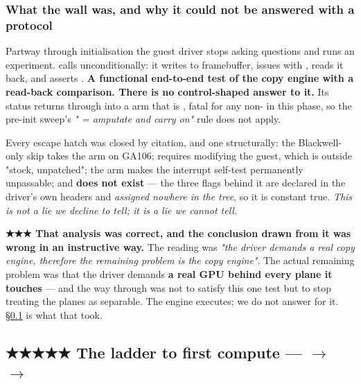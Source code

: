 \documentclass[10.5pt]{article}
\begin{document}
\subsubsection*{What the wall was, and why it could not be answered with a protocol}

Partway through initialisation the guest driver stops asking questions and runs an experiment.
 calls 
unconditionally: it
writes  to framebuffer, issues  with
, reads it back, and asserts
.
\textbf{A functional end-to-end test of the copy engine with a read-back comparison. There is no
control-shaped answer to it.} Its status returns through  into a
 arm that is , fatal for any non- in this
phase, so the pre-init sweep's \emph{" = amputate and carry on"}
rule does not apply.

Every escape hatch was closed by citation, and one structurally: the Blackwell-only skip takes the
 arm on GA106;  requires modifying the guest, which is
outside "stock, unpatched"; the  arm makes the interrupt
self-test permanently unpassable; and  \textbf{does not exist} — the three flags
behind it are declared in the driver's own headers and \emph{assigned nowhere in the tree}, so it
is constant true. \emph{This is not a lie we decline to tell; it is a lie we cannot tell.}

\textbf{★★★ That analysis was correct, and the conclusion drawn from it was wrong in an
instructive way.} The reading was \emph{"the driver demands a real copy engine, therefore the
remaining problem is the copy engine"}. The actual remaining problem was that the driver demands
\textbf{a real GPU behind every plane it touches} — and the way through was not to satisfy this
one test but to stop treating the planes as separable. The engine executes; we do not answer for
it. \S\ref{sec:ladder} is what that took.

\subsection{\texorpdfstring{★★★★★ The ladder to first compute ---  $\to$  $\to$ }{The ladder to first compute}}
\label{sec:ladder}
\end{document}

